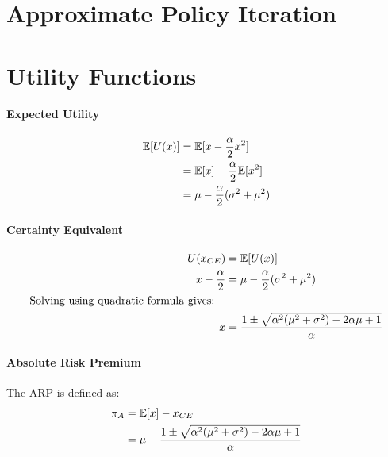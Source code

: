 \documentclass[11pt]{article}
\begin{document}
\maketitle
\thispagestyle{first}

\section{Approximate Policy Iteration}


\newpage
\section{Utility Functions}
\paragraph*{Expected Utility}
\begin{align}
    \mathbb{E}[U(x)] &= \mathbb{E}[x - \frac{\alpha}{2}x^2] \\
    &= \mathbb{E}[x] - \frac{\alpha}{2}\mathbb{E}[x^2] \\
    &= \mu - \frac{\alpha}{2}(\sigma^2+\mu^2)
\end{align}
\paragraph*{Certainty Equivalent}
\begin{align}
    U(x_{CE}) &= \mathbb{E}[U(x)]\\
    x - \frac{\alpha}{2} &= \mu - \frac{\alpha}{2}(\sigma^2 + \mu^2) \\
    \text{Solving using quadratic formula gives:}\quad &\\
    x &= \frac{1\pm\sqrt{\alpha^2(\mu^2 + \sigma^2)-2\alpha\mu + 1}}{\alpha}
\end{align}

\paragraph*{Absolute Risk Premium}
The ARP is defined as:
\begin{align}
    \pi_A &= \mathbb{E}[x] - x_{CE} \\
    &= \mu - \frac{1\pm\sqrt{\alpha^2(\mu^2 + \sigma^2)-2\alpha\mu + 1}}{\alpha}
\end{align}
\end{document}
